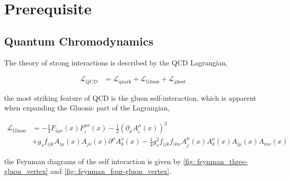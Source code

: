 \documentclass[main.tex]{subfiles}
\begin{document}
\section{Prerequisite}
\subsection{Quantum Chromodynamics}\label{sec: QCD}

The theory of strong interactions is described by the QCD Lagrangian,

\begin{align}\label{eqn: QCD_lagrangian_full}
    \mathcal{L}_{QCD} &= \mathcal{L}_{\text{quark}} + \mathcal{L}_{\text{Gluon}} + \mathcal{L}_{\text{ghost}}
\end{align}

the most striking feature of QCD is the gluon self-interaction, which is apparent when expanding the Gluonic part of the Lagrangian, 

\begin{align}
    \mathcal{L}_{\text{Gluon}} 
    &= - \frac{1}{4} F_{i\mu\nu}(x) F_i^{\mu\nu}(x) - \frac{1}{2} \left( \partial_\mu A_i^\mu(x)\right)^2 \label{eqn: QCD_Lpart_gluon}  \\
    &+ g_s f_{ijk} A_{i\mu}(x)A_{j\nu}(x) \partial^\mu A_k^\nu(x) - \frac{1}{4} g_s^2 f_{ijk} f_{ilm} A_j^\mu(x) A_k^\nu(x) A_{l\mu}(x) A_{m\nu}(x) \nonumber
\end{align}

the Feynman diagrams of the self interaction is given by \autoref{fig: feynman_three-gluon_vertex} and \autoref{fig: feynman_four-gluon_vertex}.
\end{document}
